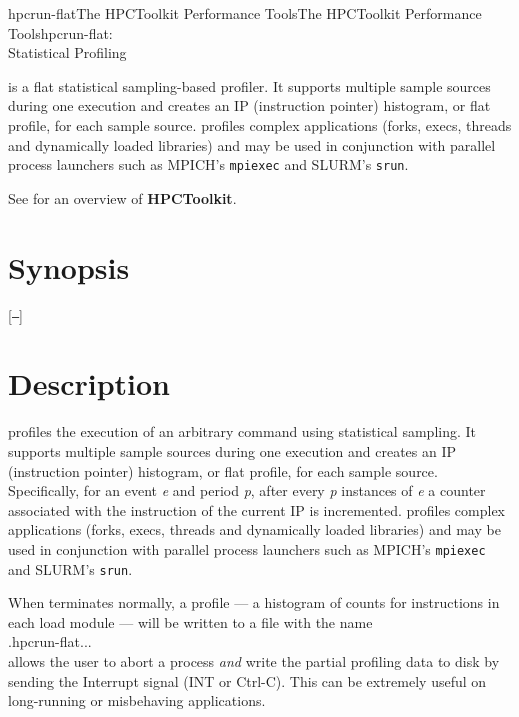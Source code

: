 \documentclass[english]{article}
\begin{document}
\begin{Name}{1}{hpcrun-flat}{The HPCToolkit Performance Tools}{The HPCToolkit Performance Tools}{hpcrun-flat:\\ Statistical Profiling}

 is a flat statistical sampling-based profiler.
It supports multiple sample sources during one execution and creates an IP (instruction pointer) histogram, or flat profile, for each sample source.
 profiles complex applications (forks, execs, threads and dynamically loaded libraries) and may be used in conjunction with parallel process launchers such as MPICH's \texttt{mpiexec} and SLURM's \texttt{srun}.

See  for an overview of \textbf{HPCToolkit}.


\end{Name}

\section{Synopsis}

  [\texttt{--}]  

 

\section{Description}

 profiles the execution of an arbitrary command  using statistical sampling.
It supports multiple sample sources during one execution and creates an IP (instruction pointer) histogram, or flat profile, for each sample source.
Specifically, for an event \emph{e} and period \emph{p}, after every \emph{p} instances of \emph{e} a counter associated with the instruction of the current IP is incremented.
 profiles complex applications (forks, execs, threads and dynamically loaded libraries) and may be used in conjunction with parallel process launchers such as MPICH's \texttt{mpiexec} and SLURM's \texttt{srun}.

When  terminates normally, a profile --- a histogram of counts for instructions in each load module --- will be written to a file with the name\\
\SP\SP\SP {}.hpcrun-flat...\\
 allows the user to abort a process \emph{and} write the partial profiling data to disk by sending the Interrupt signal (INT or Ctrl-C).  This can be extremely useful on long-running or misbehaving applications.
\end{document}
